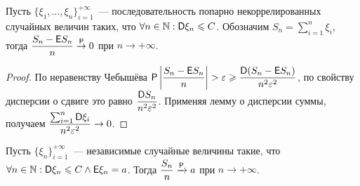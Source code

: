 \begin{theorem}
	Пусть $\{\xi_1, \ldots, \xi_n\}_{i=1}^{+\infty}$~--- последовательность  попарно некоррелированных случайных величин таких, что $\forall n \in \N : \D \xi_n \leqslant C$. Обозначим $S_n = \sum\limits_{i=1}^n \xi_i$, тогда $\dfrac{S_n - \E S_n}{n} \overset{\P}{\rightarrow} 0$ при $n \rightarrow +\infty$.
	\begin{proof}
		По неравенству Чебышёва $\P \left| \dfrac{S_n - \E S_n}{n} \right| > \varepsilon \geqslant \dfrac{\D (S_n - \E S_n)}{n^2 \varepsilon^2}$, по свойству дисперсии о сдвиге это равно $\dfrac{\D S_n}{n^2 \varepsilon^2}$. Применяя лемму о дисперсии суммы, получаем $\dfrac{\sum_{i=1}^n \D \xi_i}{n^2 \varepsilon^2} \rightarrow 0$.
	\end{proof}
\end{theorem}
\begin{consequence}
	Пусть $\{ \xi_n \}_{i=1}^{+\infty}$~--- независимые случайные величины такие, что $\forall n \in \N: \D \xi_n \leqslant C \wedge \E \xi_n = a$. Тогда $\dfrac{S_n}{n} \xrightarrow{\P} a$ при $n \rightarrow + \infty$.	
\end{consequence}
